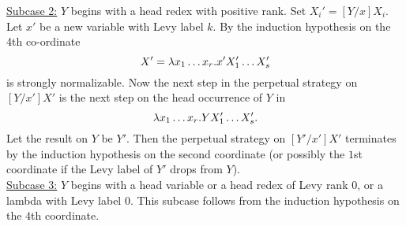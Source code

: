 \uline{Subcase 2:} $Y$ begins with a head redex with positive rank. Set $X_{i}' = [Y/x]X_{i}$. Let $x'$ be a new variable with Levy label $k$. By the induction hypothesis on the 4th co-ordinate
\begin{equation*}
  X'= \lambda x_{1} \ldots x_{r}. x' X_{1}' \ldots X_{s}'
\end{equation*} 
is strongly normalizable. Now the next step in the perpetual strategy on $[Y/x']X'$ is the next step on the head occurrence of $Y$ in
\begin{equation*}
  \lambda x_{1} \ldots x_{r}. Y X_{1}' \ldots X_{s}'.
\end{equation*}
Let the result on $Y$ be $Y'$. Then the perpetual strategy on $[Y'/x']X'$ terminates by the induction hypothesis on the second coordinate (or possibly the $1$st coordinate if the Levy label of $Y'$ drops from $Y$).\\

\uline{Subcase 3:} $Y$ begins with a head variable or a head redex of Levy rank $0$, or a lambda with Levy label $0$. This subcase follows from the induction hypothesis on the $4$th coordinate. \qqed